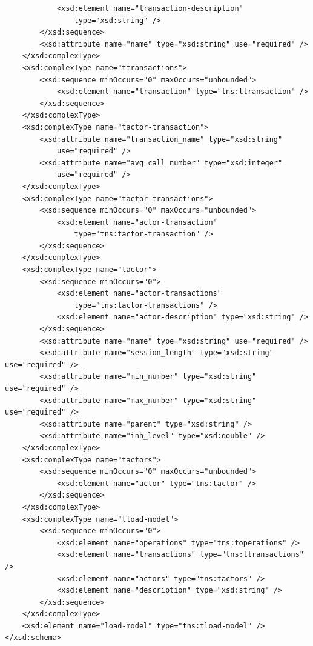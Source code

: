 \begin{Verbatim}
			<xsd:element name="transaction-description" 
				type="xsd:string" />
		</xsd:sequence>
		<xsd:attribute name="name" type="xsd:string" use="required" />
	</xsd:complexType>
	<xsd:complexType name="ttransactions">
		<xsd:sequence minOccurs="0" maxOccurs="unbounded">
			<xsd:element name="transaction" type="tns:ttransaction" />
		</xsd:sequence>
	</xsd:complexType>
	<xsd:complexType name="tactor-transaction">
		<xsd:attribute name="transaction_name" type="xsd:string" 
			use="required" />
		<xsd:attribute name="avg_call_number" type="xsd:integer" 
			use="required" />
	</xsd:complexType>
	<xsd:complexType name="tactor-transactions">
		<xsd:sequence minOccurs="0" maxOccurs="unbounded">
			<xsd:element name="actor-transaction" 
				type="tns:tactor-transaction" />
		</xsd:sequence>
	</xsd:complexType>
	<xsd:complexType name="tactor">
		<xsd:sequence minOccurs="0">
			<xsd:element name="actor-transactions" 
				type="tns:tactor-transactions" />
			<xsd:element name="actor-description" type="xsd:string" />
		</xsd:sequence>
		<xsd:attribute name="name" type="xsd:string" use="required" />
		<xsd:attribute name="session_length" type="xsd:string" use="required" />
		<xsd:attribute name="min_number" type="xsd:string" use="required" />
		<xsd:attribute name="max_number" type="xsd:string" use="required" />
		<xsd:attribute name="parent" type="xsd:string" />
		<xsd:attribute name="inh_level" type="xsd:double" />
	</xsd:complexType>
	<xsd:complexType name="tactors">
		<xsd:sequence minOccurs="0" maxOccurs="unbounded">
			<xsd:element name="actor" type="tns:tactor" />
		</xsd:sequence>
	</xsd:complexType>
	<xsd:complexType name="tload-model">
		<xsd:sequence minOccurs="0">
			<xsd:element name="operations" type="tns:toperations" />
			<xsd:element name="transactions" type="tns:ttransactions" />
			<xsd:element name="actors" type="tns:tactors" />
			<xsd:element name="description" type="xsd:string" />
		</xsd:sequence>
	</xsd:complexType>
	<xsd:element name="load-model" type="tns:tload-model" />
</xsd:schema>
\end{Verbatim}

